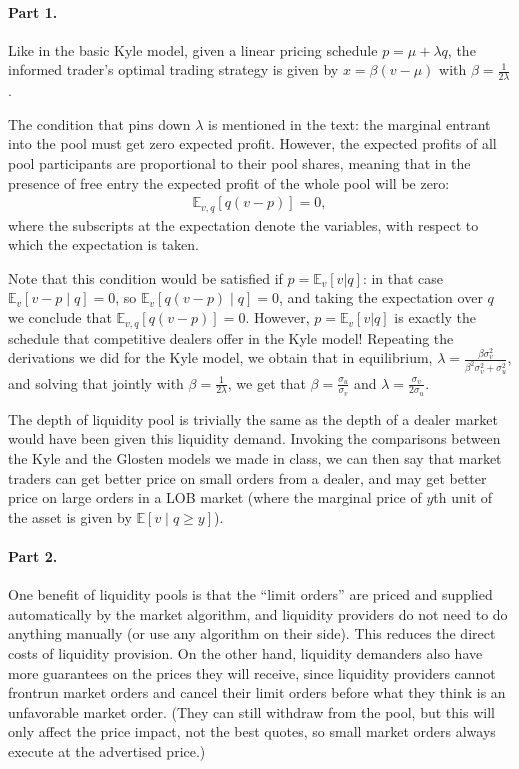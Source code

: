 \begin{solution}
	\paragraph{Part 1.}
	Like in the basic Kyle model, given a linear pricing schedule $p = \mu + \lambda q$, the informed trader's optimal trading strategy is given by $x = \beta (v-\mu)$ with $\beta = \frac{1}{2\lambda}$.
	
	The condition that pins down $\lambda$ is mentioned in the text: the marginal entrant into the pool must get zero expected profit. However, the expected profits of all pool participants are proportional to their pool shares, meaning that in the presence of free entry the expected profit of the whole pool will be zero:
	\begin{align*}
		\mathbb{E}_{v,q} \left[ q (v - p) \right] = 0,
	\end{align*}
	where the subscripts at the expectation denote the variables, with respect to which the expectation is taken.
	
	Note that this condition would be satisfied if $p = \mathbb{E}_v[v|q]$: in that case $\mathbb{E}_v[v-p \mid q]=0$, so $\mathbb{E}_v[q(v-p) \mid q] = 0$, and taking the expectation over $q$ we conclude that $\mathbb{E}_{v,q} \left[ q (v - p) \right] = 0$.
	However, $p = \mathbb{E}_v[v|q]$ is exactly the schedule that competitive dealers offer in the Kyle model! Repeating the derivations we did for the Kyle model, we obtain that in equilibrium, $\lambda = \frac{\beta \sigma^2_v}{\beta^2 \sigma^2_v + \sigma^2_u}$, and solving that jointly with $\beta = \frac{1}{2\lambda}$, we get that $\beta = \frac{\sigma_u}{\sigma_v}$ and $\lambda = \frac{\sigma_v}{2\sigma_u}$.
	
	The depth of liquidity pool is trivially the same as the depth of a dealer market would have been given this liquidity demand. Invoking the comparisons between the Kyle and the Glosten models we made in class, we can then say that market traders can get better price on small orders from a dealer, and may get better price on large orders in a LOB market (where the marginal price of $y$th unit of the asset is given by $\mathbb{E}[v \mid q \geq y]$).
	
	\paragraph{Part 2.}
	One benefit of liquidity pools is that the ``limit orders'' are priced and supplied automatically by the market algorithm, and liquidity providers do not need to do anything manually (or use any algorithm on their side). This reduces the direct costs of liquidity provision. On the other hand, liquidity demanders also have more guarantees on the prices they will receive, since liquidity providers cannot frontrun market orders and cancel their limit orders before what they think is an unfavorable market order. (They can still withdraw from the pool, but this will only affect the price impact, not the best quotes, so small market orders always execute at the advertised price.)
	

\end{solution}
